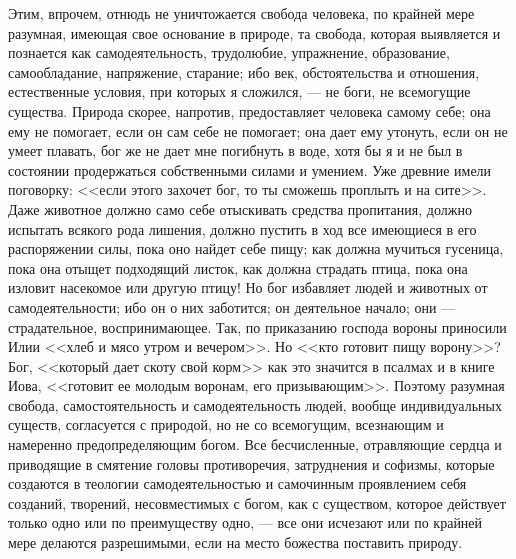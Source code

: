 \documentclass[12pt]{article}
\begin{document}
Этим, впрочем, отнюдь не уничтожается свобода человека, по крайней мере разумная, имеющая свое основание в природе, та свобода, которая выявляется и познается как самодеятельность, трудолюбие, упражнение, образование, самообладание, напряжение, старание; ибо век, обстоятельства и отношения, естественные условия, при которых я сложился, --- не боги, не всемогущие существа. Природа скорее, напротив, предоставляет человека самому себе; она ему не помогает, если он сам себе не помогает; она дает ему утонуть, если он не умеет плавать, бог же не дает мне погибнуть в воде, хотя бы я и не был в состоянии продержаться собственными силами и умением. Уже древние имели поговорку: <<если этого захочет бог, то ты сможешь проплыть и на сите>>. Даже животное должно само себе отыскивать средства пропитания, должно испытать всякого рода лишения, должно пустить в ход все имеющиеся в его распоряжении силы, пока оно найдет себе пищу; как должна мучиться гусеница, пока она отыщет подходящий листок, как должна страдать птица, пока она изловит насекомое или другую птицу! Но бог избавляет людей и животных от самодеятельности; ибо он о них заботится; он деятельное начало; они --- страдательное, воспринимающее. Так, по приказанию господа вороны приносили Илии <<хлеб и мясо утром и вечером>>. Но <<кто готовит пищу ворону>>? Бог, <<который дает скоту свой корм>>  как это значится в псалмах и в книге Иова, <<готовит ее молодым воронам, его призывающим>>. Поэтому разумная свобода, самостоятельность и самодеятельность людей, вообще индивидуальных существ, согласуется с природой, но не со всемогущим, всезнающим и намеренно предопределяющим богом. Все бесчисленные, отравляющие сердца и приводящие в смятение головы противоречия, затруднения и софизмы, которые создаются в теологии самодеятельностью и самочинным проявлением себя созданий, творений, несовместимых с богом, как с существом, которое действует только одно или по преимуществу одно, --- все они исчезают или по крайней мере делаются разрешимыми, если на место божества поставить природу. 
\end{document}
